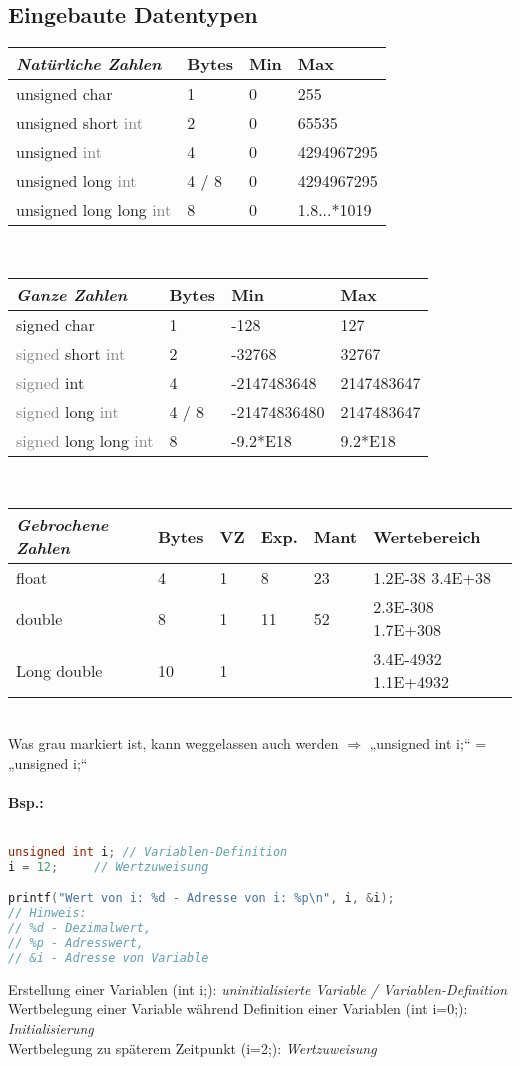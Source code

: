 \subsection{Eingebaute Datentypen}
\begin{tabular}{l | l l l}
\emph{Natürliche Zahlen} & Bytes & Min & Max\\
\hline
unsigned char&1&0&255\\
unsigned short \textcolor{gray}{int}&2&0&65535\\
unsigned \textcolor{gray}{int}&4&0&4294967295\\
unsigned long \textcolor{gray}{int}&4 / 8&0&4294967295\\
unsigned long long \textcolor{gray}{int}&8&0&1.8...*1019
\end{tabular}\medskip\\
\begin{tabular}{l | l l l}
\emph{Ganze Zahlen}&Bytes&Min&Max\\
\hline
signed char&1&-128&127\\
\textcolor{gray}{signed} short \textcolor{gray}{int}&2&-32768&32767\\
\textcolor{gray}{signed} int&4&-2147483648&2147483647\\
\textcolor{gray}{signed} long \textcolor{gray}{int}&4 / 8&-21474836480&2147483647\\
\textcolor{gray}{signed} long long \textcolor{gray}{int}&8&-9.2*E18&9.2*E18\\
\end{tabular}\medskip\\
\begin{tabular}{l | l l l l l}
\emph{Gebrochene Zahlen}&Bytes&VZ&Exp.&Mant&Wertebereich\\
\hline
float&4&1&8&23&1.2E-38 \quad 3.4E+38\\
double&8&1&11&52&2.3E-308 \quad 1.7E+308\\
Long double&10&1&&&3.4E-4932 \quad 1.1E+4932\\
\end{tabular}\medskip\\
Was grau markiert ist, kann weggelassen auch werden $\Rightarrow$ „unsigned int i;“ = „unsigned i;“

\paragraph{Bsp.:} $ $
\begin{lstlisting}[language=C]
unsigned int i;	// Variablen-Definition
i = 12;		// Wertzuweisung

printf("Wert von i: %d - Adresse von i: %p\n", i, &i);
// Hinweis: 
// %d - Dezimalwert, 
// %p - Adresswert, 
// &i - Adresse von Variable
\end{lstlisting}
Erstellung einer Variablen (int i;): \emph{uninitialisierte Variable / Variablen-Definition}\\
Wertbelegung einer Variable während Definition einer Variablen (int i=0;): \emph{Initialisierung}\\
Wertbelegung zu späterem Zeitpunkt (i=2;): \emph{Wertzuweisung}

